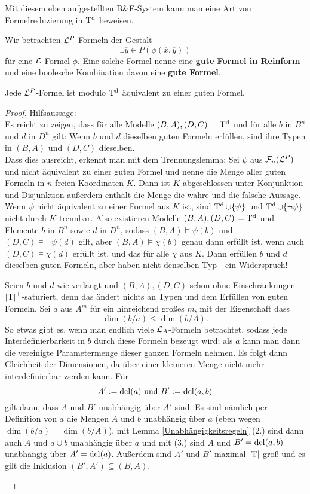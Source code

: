 Mit diesem eben aufgestellten B\&F-System kann man eine Art von Formelreduzierung in $\operatorname{T^d}$ beweisen.
\begin{definition}
	Wir betrachten $\mathcal{L}^P$-Formeln der Gestalt
	$$\exists\overline{y}\in P(\phi(\overline{x},\overline{y}))$$
	für eine $\mathcal{L}$-Formel $\phi$. Eine solche Formel nenne eine \textbf{gute Formel in Reinform} und eine boolesche Kombination davon eine \textbf{gute Formel}.
\end{definition}
\newpage
\begin{theorem}\label{Formelreduzierung}
	Jede $\mathcal{L}^P$-Formel ist modulo $\operatorname{T^d}$ äquivalent zu einer guten Formel.	
\end{theorem}
\begin{proof}
	\underline{Hilfsaussage:}\\
	Es reicht zu zeigen, dass für alle Modelle $(B,A),(D,C)\models\operatorname{T^d}$ und für alle $b$ in $B^n$ und $d$ in $D^n$ gilt: Wenn $b$ und $d$ dieselben guten Formeln erfüllen, sind ihre Typen in $(B,A)$ und $(D,C)$ dieselben.\\
	Dass dies ausreicht, erkennt man mit dem Trennungslemma:\linebreak
	Sei $\psi$ aus $\mathcal{F}_n(\mathcal{L}^P)$ und nicht äquivalent zu einer guten Formel und nenne die Menge aller guten Formeln in $n$ freien Koordinaten $K$. Dann ist $K$ abgeschlossen unter Konjunktion und Disjunktion außerdem enthält die Menge die wahre und die falsche Aussage. Wenn $\psi$ nicht äquivalent zu einer Formel aus $K$ ist, sind $\operatorname{T^d}\cup\{\psi\}$ und $\operatorname{T^d}\cup\{\neg\psi\}$ nicht durch $K$ trennbar. Also existieren Modelle $(B,A),(D,C)\models\operatorname{T^d}$ und Elemente $b$ in $B^n$ sowie $d$ in $D^n$, sodass $(B,A)\models\psi(b)$ und $(D,C)\models\neg\psi(d)$ gilt, aber $(B,A)\models\chi(b)$ genau dann erfüllt ist, wenn auch $(D,C)\models\chi(d)$ erfüllt ist, und das für alle $\chi$ aus $K$. Dann erfüllen $b$ und $d$ dieselben guten Formeln, aber haben nicht denselben Typ - ein Widerspruch!
	\begin{proof2}
		Seien $b$ und $d$ wie verlangt und $(B,A),(D,C)$ schon ohne Einschränkungen ${\left| \operatorname{T} \right|}^+$-saturiert, denn das ändert nichts an Typen und dem Erfüllen von guten Formeln. Sei $a$ aus $A^m$ für ein hinreichend großes $m$, mit der Eigenschaft dass $$\dim(b/a)\leq\dim(b/A).$$ So etwas gibt es, wenn man endlich viele $\mathcal{L}_A$-Formeln betrachtet, sodass jede Interdefinierbarkeit in $b$ durch diese Formeln bezeugt wird; als $a$ kann man dann die vereinigte Parametermenge dieser ganzen Formeln nehmen. Es folgt dann Gleichheit der Dimensionen, da über einer kleineren Menge nicht mehr interdefinierbar werden kann. Für $$A':=\operatorname{dcl}(a)\text{ und }B':=\operatorname{dcl}(a,b)$$ gilt dann, dass $A$ und $B'$ unabhängig über $A'$ sind. Es sind nämlich per Definition von $a$ die Mengen $A$ und $b$ unabhängig über $a$ (eben wegen $\dim(b/a)=\dim(b/A)$), mit Lemma \ref{Unabhängigkeitsregeln} (2.) sind dann auch $A$ und $a\cup b$ unabhängig über $a$ und mit (3.) sind $A$ und $B'=\operatorname{dcl}(a,b)$ unabhängig über $A'=\operatorname{dcl}(a)$. Außerdem sind $A'$ und $B'$ maximal ${\left| \operatorname{T} \right|}$ groß und es gilt die Inklusion $(B',A')\subseteq (B,A)$.\\

\end{proof2}
\end{proof}
